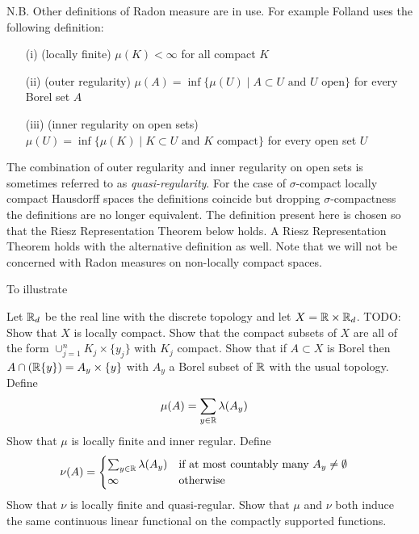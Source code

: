 N.B. Other definitions of Radon measure are in use.  For example Folland uses the following definition:
\begin{itemize} 
\item[(i)] (locally finite) $\mu(K)< \infty$ for all compact $K$
\item[(ii)] (outer regularity) $\mu(A) = \inf \lbrace \mu(U) \mid A \subset U \text{ and $U$ open} \rbrace$ for every Borel set $A$
\item[(iii)] (inner regularity on open sets) $\mu(U) = \inf \lbrace \mu(K) \mid K \subset U \text{ and $K$ compact} \rbrace$ for every open set $U$
\end{itemize}
The combination of outer regularity and inner regularity on open sets is sometimes referred to as \emph{quasi-regularity}.
For the case of $\sigma$-compact locally compact Hausdorff spaces the definitions coincide but dropping $\sigma$-compactness the definitions are no longer equivalent.  The definition present here is chosen so that the Riesz Representation Theorem below holds.  A Riesz Representation Theorem holds with the alternative definition as well. Note that we will not be concerned with Radon measures on non-locally compact spaces.

To illustrate 
\begin{examp}Let $\mathbb{R}_d$ be the real line with the discrete topology and let $X = \mathbb{R} \times \mathbb{R}_d$.  TODO: Show that $X$ is locally compact.  Show that the compact subsets of $X$ are all of the form $\cup_{j=1}^n K_j \times \lbrace y_j \rbrace$ with $K_j$ compact.  Show that if $A \subset X$ is Borel then $A \cap (\mathbb{R} \lbrace y \rbrace) = A_y \times \lbrace y \rbrace$ with $A_y$ a Borel subset of $\mathbb{R}$ with the usual topology.  Define 
\begin{align*}
\mu(A) &= \sum_{y \in \mathbb{R}} \lambda(A_y)
\end{align*}
Show that $\mu$ is locally finite and inner regular.  Define 
\begin{align*}
\nu(A) &= \begin{cases}
\sum_{y \in \mathbb{R}} \lambda(A_y) & \text{if at most countably many $A_y \neq \emptyset$} \\
\infty & \text{otherwise}
\end{cases}
\end{align*}
Show that $\nu$ is locally finite and quasi-regular.  Show that $\mu$ and $\nu$ both induce the same continuous linear functional on the compactly supported functions.
\end{examp}

